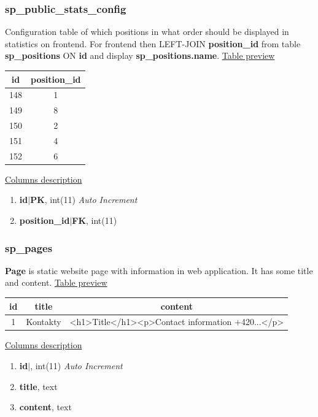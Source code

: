 \subsubsection*{sp\_public\_stats\_config}
Configuration table of which positions in what order should be displayed in statistics on frontend. For frontend then LEFT-JOIN \textbf{position\_id} from table \textbf{sp\_positions} ON \textbf{id} and display \textbf{sp\_positions.name}.
\newline
\underline{Table preview}
\begin{center}
 \begin{tabular}{||c c||} 
 \hline
 id & position\_id  \\ [0.5ex] 
 \hline\hline
 148 & 1 \\ 
 \hline
 149 & 8  \\ 
 \hline
 150 & 2  \\ 
 \hline
 151 & 4  \\ 
 \hline
 152 & 6  \\  
 \hline
 \end{tabular}
\end{center}
\underline{Columns description}
\begin{enumerate}
  \setlength\itemsep{0em}
  \item \textbf{id$|$PK}, int(11) \textit{Auto Increment}
  \item \textbf{position\_id$|$FK}, int(11)
\end{enumerate}

\subsubsection*{sp\_pages}
\textbf{Page} is static website page with information in web application. It has some title and content.
\newline
\underline{Table preview}
\begin{center}
 \begin{tabular}{||c c c||} 
 \hline
 id & title & content \\ [0.5ex] 
 \hline\hline
 1 & Kontakty &  \textless h1\textgreater Title\textless /h1\textgreater  \textless p\textgreater Contact information +420...\textless /p\textgreater  \\

 \hline
\end{tabular}
\end{center}
\underline{Columns description}
\begin{enumerate}
  \setlength\itemsep{0em}
  \item \textbf{id$|$}, int(11) \textit{Auto Increment}
  \item \textbf{title}, text
  \item \textbf{content}, text
\end{enumerate}
\newpage
